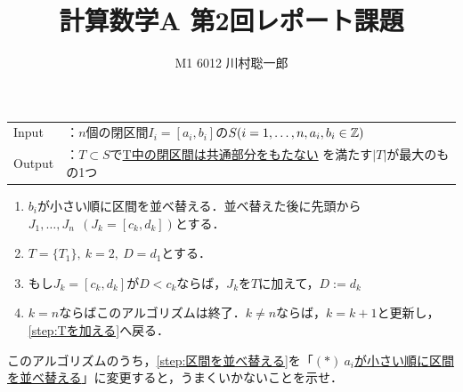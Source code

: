 \documentclass[dvipdfmx]{jsreport}
\title{計算数学A 第2回レポート課題}
\author{M1 6012 川村聡一郎}
\date{}
\begin{document}
\maketitle

\begin{tcolorbox}
\begin{tcolorbox}[title= 区間スケジューリングに関するソートアルゴリズム]
\begin{tabular}{ll}
	Input&：$n$個の閉区間$I_i= [a_i, b_i]$の$S(i= 1, \ldots, n, a_i, b_i\in \mathbb{Z})$\\
	Output&：$T\subset S$で\underline{T中の閉区間は共通部分をもたない}	を満たす$|T|$が最大のもの1つ
\end{tabular}	

\begin{enumerate}
	\item \label{step:区間を並べ替える}$b_i$が小さい順に区間を並べ替える．並べ替えた後に先頭から$J_1, \ldots, J_n\ \ (J_k= [c_k, d_k])$とする．
	\item \label{step:Tの定義}$T= \{T_1\},\ k= 2,\ D= d_1$とする．
	\item \label{step:Tを加える}もし$J_k= [c_k, d_k]$が$D< c_k$ならば，$J_k$を$T$に加えて，$D:= d_k$
	\item \label{step:アルゴリズムの終了}$k= n$ならばこのアルゴリズムは終了．$k\ne n$ならば，$k= k+ 1$と更新し，\eqref{step:Tを加える}へ戻る．
\end{enumerate}
\end{tcolorbox}
	このアルゴリズムのうち，\eqref{step:区間を並べ替える}を「\underline{$(*)\ a_i$が小さい順に区間を並べ替える}」に変更すると，うまくいかないことを示せ．
\end{tcolorbox}
\end{document}
